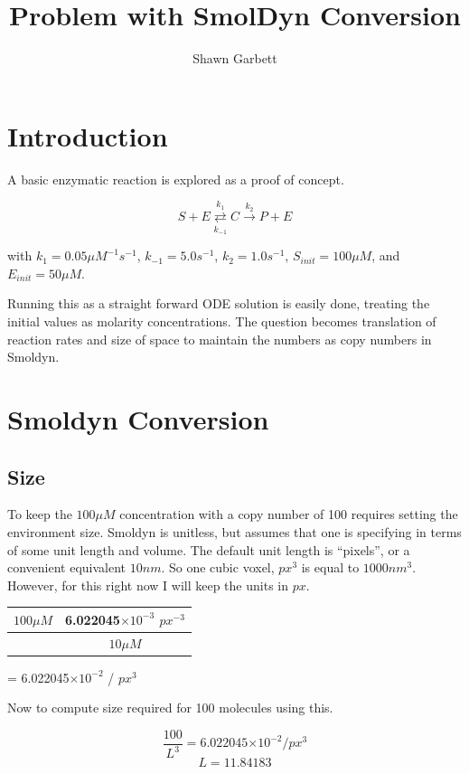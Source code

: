 \documentclass{article}
\providecommand{\e}[1]{\ensuremath{\times 10^{#1}}}
\begin{document}
\title{Problem with SmolDyn Conversion}
\author{Shawn Garbett}

\section{Introduction}

A basic enzymatic reaction is explored as a proof of concept.

\begin{equation}
S + E \overset{k_1}{\underset{k_{-1}}{\rightleftarrows}} C \overset{k_2}{\rightarrow} P + E
\end{equation}

with $k_1 = 0.05 \mu M^{-1} s^{-1}$, $k_{-1} = 5.0 s^{-1}$, $k_2 = 1.0 s^{-1}$, $S_{init} = 100 \mu M$, and $E_{init} = 50\mu M$.

Running this as a straight forward ODE solution is easily done, treating the initial values as molarity concentrations. The question becomes translation of reaction rates and size of space to maintain the numbers as copy numbers in Smoldyn.

\section{Smoldyn Conversion}

\subsection{Size}

To keep the $100\mu M$ concentration with a copy number of 100 requires setting the environment size. Smoldyn is unitless, but assumes that one is specifying in terms of some unit length and volume. The default unit length is ``pixels'', or a convenient equivalent $10 nm$. So one cubic voxel, $px^3$ is equal to $1000 nm^3$. However, for this right now I will keep the units in $px$.

\begin{center}
\begin{tabular}{c|c}
$100 \mu M$ & 6.022045\e{-3} $px^{-3}$\\
\hline
 & $10 \mu M$ \\
\end{tabular} = 6.022045\e{-2} / $px^3$
\end{center}

Now to compute size required for 100 molecules using this.


\begin{equation}
\frac{100}{L^3} = 6.022045\e{-2} / px^3
\end{equation}
\begin{equation}
    L = 11.84183
\end{equation}
\end{document}
